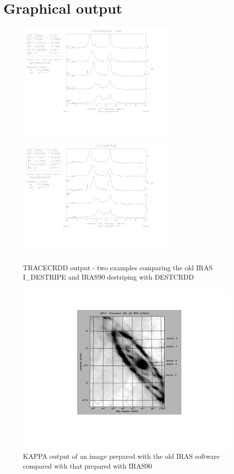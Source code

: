 \documentclass[twoside,11pt]{starlink}
\begin{document}
\section{Graphical output
\label{a:a}}

\begin{figure}[h]
\centering
\includegraphics[width=0.7\textwidth]{sun161_a_1_1}
\includegraphics[width=0.7\textwidth]{sun161_a_1_2}
\caption[TRACECRDD output]{TRACECRDD output - two examples comparing the old IRAS
I\_DESTRIPE and IRAS90 destriping with DESTCRDD}
\label{a:a1}
\end{figure}

\begin{figure}[h]
\includegraphics[width=\textwidth]{sun161_a_2_1}
\caption[KAPPA output of image]{KAPPA output of an image prepared with the old IRAS software
compared with that prepared with IRAS90}
\label{a:a2}
\end{figure}
\end{document}
